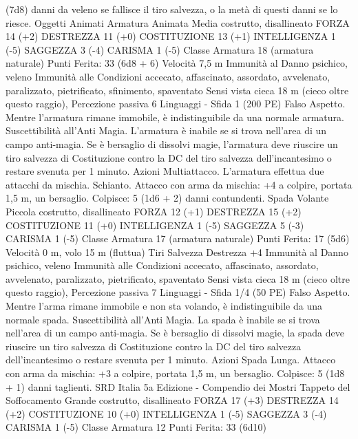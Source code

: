 \begin{multicols}{2}
(7d8) danni da veleno se fallisce il tiro salvezza, o la metà di
questi danni se lo riesce.
Oggetti Animati
Armatura Animata
Media costrutto, disallineato
FORZA 14 (+2)
DESTREZZA 11 (+0)
COSTITUZIONE 13 (+1)
INTELLIGENZA 1 (-5)
SAGGEZZA 3 (-4)
CARISMA 1 (-5)
Classe Armatura 18 (armatura naturale)
\hspace*{0pt}\hfill{Punti Ferita}: 33 (6d8 + 6)
Velocità 7,5 m
Immunità al Danno psichico, veleno
Immunità alle Condizioni accecato, affascinato, assordato,
avvelenato, paralizzato, pietrificato, sfinimento, spaventato
Sensi vista cieca 18 m (cieco oltre questo raggio), Percezione
passiva 6
Linguaggi -
Sfida 1 (200 PE)
Falso Aspetto. Mentre l’armatura rimane immobile, è
indistinguibile da una normale armatura.
Suscettibilità all’Anti Magia. L’armatura è inabile se si trova
nell’area di un campo anti-magia. Se è bersaglio di dissolvi
magie, l’armatura deve riuscire un tiro salvezza di Costituzione
contro la DC del tiro salvezza dell’incantesimo o restare svenuta
per 1 minuto.
Azioni
Multiattacco. L’armatura effettua due attacchi da mischia.
Schianto. Attacco con arma da mischia: +4 a colpire, portata 1,5
m, un bersaglio.
Colpisce: 5 (1d6 + 2) danni contundenti.
Spada Volante
Piccola costrutto, disallineato
FORZA 12 (+1)
DESTREZZA 15 (+2)
COSTITUZIONE 11 (+0)
INTELLIGENZA 1 (-5)
SAGGEZZA 5 (-3)
CARISMA 1 (-5)
Classe Armatura 17 (armatura naturale)
\hspace*{0pt}\hfill{Punti Ferita}: 17 (5d6)
Velocità 0 m, volo 15 m (fluttua)
Tiri Salvezza Destrezza +4
Immunità al Danno psichico, veleno
Immunità alle Condizioni accecato, affascinato, assordato,
avvelenato, paralizzato, pietrificato, spaventato
Sensi vista cieca 18 m (cieco oltre questo raggio), Percezione
passiva 7
Linguaggi -
Sfida 1/4 (50 PE)
Falso Aspetto. Mentre l’arma rimane immobile e non sta
volando, è indistinguibile da una normale spada.
Suscettibilità all’Anti Magia. La spada è inabile se si trova
nell’area di un campo anti-magia. Se è bersaglio di dissolvi
magie, la spada deve riuscire un tiro salvezza di Costituzione
contro la DC del tiro salvezza dell’incantesimo o restare svenuta
per 1 minuto.
Azioni
Spada Lunga. Attacco con arma da mischia: +3 a colpire,
portata 1,5 m, un bersaglio.
Colpisce: 5 (1d8 + 1) danni taglienti.
SRD Italia 5a Edizione - Compendio dei Mostri
Tappeto del Soffocamento
Grande costrutto, disallineato
FORZA 17 (+3)
DESTREZZA 14 (+2)
COSTITUZIONE 10 (+0)
INTELLIGENZA 1 (-5)
SAGGEZZA 3 (-4)
CARISMA 1 (-5)
Classe Armatura 12
\hspace*{0pt}\hfill{Punti Ferita}: 33 (6d10)

\end{multicols}
